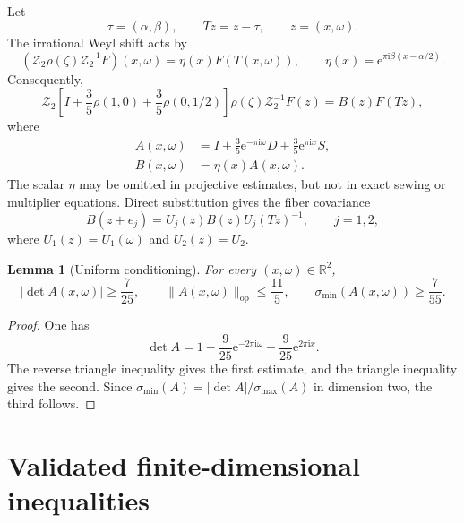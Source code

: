 \documentclass[11pt,reqno]{amsart}
\numberwithin{equation}{section}
\newtheorem{lemma}[theorem]{Lemma}
\theoremstyle{definition}
\newcommand{\R}{\mathbb R}
\newcommand{\cZtwo}{\mathcal Z_2}
\newcommand{\norm}[1]{\lVert #1\rVert}
\newcommand{\abs}[1]{\lvert #1\rvert}
\newcommand{\e}{\mathrm e}
\newcommand{\ii}{\mathrm i}
\begin{document}
Let
\begin{equation}\label{eq:base-map}
 \tau=(\alpha,\beta),\qquad Tz=z-\tau,\qquad z=(x,\omega).
\end{equation}
The irrational Weyl shift acts by
\begin{equation}\label{eq:irrational-action}
 (\cZtwo\rho(\zeta)\cZtwo^{-1}F)(x,\omega)
 =\eta(x)F(T(x,\omega)),\qquad
 \eta(x)=\e^{\pi\ii\beta(x-\alpha/2)}.
\end{equation}
Consequently,
\begin{equation}\label{eq:zak-cocycle-action}
 \cZtwo\left[I+\frac35\rho(1,0)+\frac35\rho(0,1/2)\right]
 \rho(\zeta)\cZtwo^{-1}F(z)=B(z)F(Tz),
\end{equation}
where
\begin{align}
 A(x,\omega)&=I+\frac35\e^{-\pi\ii\omega}D
                  +\frac35\e^{\pi\ii x}S,\label{eq:A-definition}\\
 B(x,\omega)&=\eta(x)A(x,\omega).\label{eq:B-definition}
\end{align}
The scalar $\eta$ may be omitted in projective estimates, but not in exact
sewing or multiplier equations.  Direct substitution gives the fiber
covariance
\begin{equation}\label{eq:B-covariance}
 B(z+e_j)=U_j(z)B(z)U_j(Tz)^{-1},\qquad j=1,2,
\end{equation}
where $U_1(z)=U_1(\omega)$ and $U_2(z)=U_2$.

\begin{lemma}[Uniform conditioning]\label{lem:conditioning}
For every $(x,\omega)\in\R^2$,
\begin{equation}\label{eq:conditioning}
 \abs{\det A(x,\omega)}\ge\frac7{25},\qquad
 \norm{A(x,\omega)}_{\mathrm{op}}\le\frac{11}{5},\qquad
 \sigma_{\min}(A(x,\omega))\ge\frac7{55}.
\end{equation}
\end{lemma}

\begin{proof}
One has
\[
 \det A=1-\frac9{25}\e^{-2\pi\ii\omega}
          -\frac9{25}\e^{2\pi\ii x}.
\]
The reverse triangle inequality gives the first estimate, and the triangle
inequality gives the second.  Since
$\sigma_{\min}(A)=|\det A|/\sigma_{\max}(A)$ in dimension two, the third
follows.
\end{proof}

\section{Validated finite-dimensional inequalities}
\label{sec:certificates}
\end{document}
